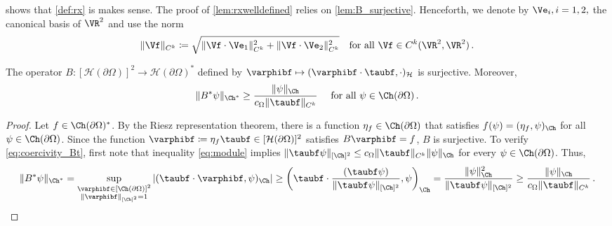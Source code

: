 \documentclass{siamart1116}
\numberwithin{theorem}{section}
\begin{document}
 shows that \cref{def:rx} is makes sense.
The proof of \cref{lem:rxwelldefined} relies on \cref{lem:B_surjective}.
Henceforth, we denote by $\Ve_i, i =1,2,$ the canonical basis of $\VR^2$ and
use the norm
\begin{equation}
\|\Vf\|_{C^k}\coloneqq \sqrt{\Vert \Vf\cdot\Ve_1\Vert_{C^k}^2+\Vert \Vf\cdot\Ve_2\Vert_{C^k}^2}
\quad \text{for all } \Vf\in C^k(\VR^2, \VR^2)\,.
\end{equation}

\begin{lemma}\label{lem:B_surjective}
The operator $B:[\mathcal H(\partial\Omega)]^2 \rightarrow \mathcal H(\partial\Omega)^*$ defined by  $\varphibf \mapsto (\varphibf\cdot \taubf, \cdot)_{\mathcal H}$ is surjective. Moreover, 
\begin{equation}\label{eq:coercivity_Bt}
\|B^*\psi\|_{\Ch^*} \ge \frac{\|\psi\|_{\Ch}}{c_{\Omega} \|\taubf\|_{C^k}}  \quad \text{ for all } \psi \in \Ch(\partial\Omega)\,.
\end{equation} 
\end{lemma}

\begin{proof}
Let $f\in \Ch(\partial\Omega)^*$. By the Riesz representation theorem, there is a function
$\eta_f\in \Ch(\partial\Omega)$ that satisfies $f(\psi) = (\eta_f, \psi)_\Ch$ for all $\psi\in \Ch(\partial\Omega)$.
Since the function $\varphibf \coloneqq \eta_f\taubf\in [\mathcal H(\partial\Omega)]^2$ satisfies $B\varphibf = f$, $B$ is surjective. To verify \cref{eq:coercivity_Bt}, first note that
inequality \cref{eq:module} implies $\|\taubf\psi\|_{[\Ch]^2}\leq c_{\Omega} \|\taubf\|_{C^k} \|\psi\|_{\Ch}$
for every $\psi \in \Ch(\partial\Omega)$. Thus,
\begin{equation*}
\|B^*\psi\|_{\Ch^*}
= \sup_{\substack{\varphibf\in [\Ch(\partial\Omega)]^2 \\
\|\varphibf\|_{ [\Ch]^2}= 1 }}| (\taubf\cdot \varphibf, \psi)_{\Ch}|
\ge  \left(\taubf\cdot\frac{ (\taubf\psi)}{\|\taubf\psi\|_{[\Ch]^2}}, \psi\right)_{\Ch}
 = \frac{\|\psi\|_{\Ch}^2 }{\|\taubf\psi\|_{[\Ch]^2}}
\geq \frac{\|\psi\|_{\Ch}}{c_{\Omega} \|\taubf\|_{C^k}}\,.
\end{equation*}
\end{proof}
\end{document}
